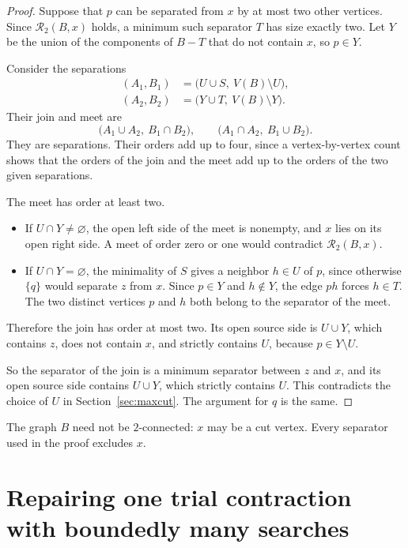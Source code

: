 \documentclass[11pt]{article}
\newcommand{\cR}{\mathcal R}
\begin{document}
\begin{proof}
Suppose that $p$ can be separated from $x$ by at most two other vertices.
Since $\cR_2(B,x)$ holds, a minimum such separator $T$ has size exactly two.
Let $Y$ be the union of the components of $B-T$ that do not contain $x$, so
$p\in Y$.

Consider the separations
\begin{align*}
(A_1,B_1)&=\bigl(U\cup S,\ V(B)\setminus U\bigr),\\
(A_2,B_2)&=\bigl(Y\cup T,\ V(B)\setminus Y\bigr).
\end{align*}
Their join and meet are
\begin{equation*}
\bigl(A_1\cup A_2,\ B_1\cap B_2\bigr),
\qquad
\bigl(A_1\cap A_2,\ B_1\cup B_2\bigr).
\end{equation*}
They are separations. Their orders add up to four, since a vertex-by-vertex
count shows that the orders of the join and the meet add up to the orders of
the two given separations.

The meet has order at least two.
\begin{itemize}[nosep]
\item If $U\cap Y\ne\varnothing$, the open left side of the meet is nonempty,
and $x$ lies on its open right side. A meet of order zero or one would
contradict $\cR_2(B,x)$.
\item If $U\cap Y=\varnothing$, the minimality of $S$ gives a neighbor $h\in U$
of $p$, since otherwise $\{q\}$ would separate $z$ from $x$. Since $p\in Y$
and $h\notin Y$, the edge $ph$ forces $h\in T$. The two distinct vertices $p$
and $h$ both belong to the separator of the meet.
\end{itemize}

Therefore the join has order at most two. Its open source side is $U\cup Y$,
which contains $z$, does not contain $x$, and strictly contains $U$, because
$p\in Y\setminus U$.

So the separator of the join is a minimum separator between $z$ and $x$, and
its open source side contains $U\cup Y$, which strictly contains $U$. This
contradicts the choice of $U$ in Section~\ref{sec:maxcut}. The argument for $q$
is the same.
\end{proof}

The graph $B$ need not be $2$-connected: $x$ may be a cut vertex. Every
separator used in the proof excludes $x$.

\section{Repairing one trial contraction with boundedly many searches}\label{sec:repair}
\end{document}
